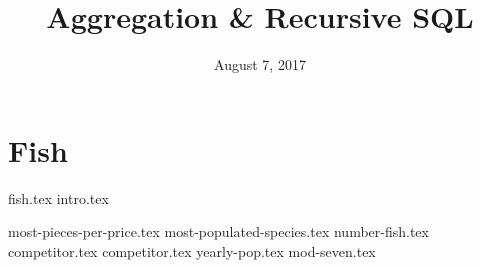 \documentclass{exam}
\title{Aggregation \& Recursive SQL}
\date{August 7, 2017}
\begin{document}
\maketitle

\section{Fish}
{fish.tex}
{intro.tex}
\begin{questions}
{most-pieces-per-price.tex}
{most-populated-species.tex}
{number-fish.tex}
\clearpage
{competitor.tex}
{competitor.tex}
{yearly-pop.tex}
{mod-seven.tex}
\end{questions}
\end{document}
